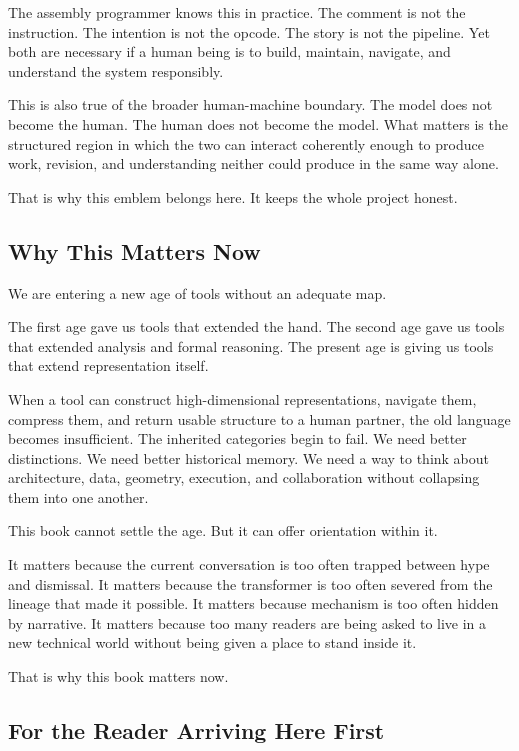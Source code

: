 The assembly programmer knows this in practice. The comment is not the
instruction. The intention is not the opcode. The story is not the
pipeline. Yet both are necessary if a human being is to build, maintain,
navigate, and understand the system responsibly.

This is also true of the broader human-machine boundary. The model does
not become the human. The human does not become the model. What matters
is the structured region in which the two can interact coherently enough
to produce work, revision, and understanding neither could produce in
the same way alone.

That is why this emblem belongs here. It keeps the whole project honest.

\hypertarget{why-this-matters-now}{%
\subsection{Why This Matters Now}\label{why-this-matters-now}}

We are entering a new age of tools without an adequate map.

The first age gave us tools that extended the hand. The second age gave
us tools that extended analysis and formal reasoning. The present age is
giving us tools that extend representation itself.

When a tool can construct high-dimensional representations, navigate
them, compress them, and return usable structure to a human partner, the
old language becomes insufficient. The inherited categories begin to
fail. We need better distinctions. We need better historical memory. We
need a way to think about architecture, data, geometry, execution, and
collaboration without collapsing them into one another.

This book cannot settle the age. But it can offer orientation within it.

It matters because the current conversation is too often trapped between
hype and dismissal. It matters because the transformer is too often
severed from the lineage that made it possible. It matters because
mechanism is too often hidden by narrative. It matters because too many
readers are being asked to live in a new technical world without being
given a place to stand inside it.

That is why this book matters now.

\hypertarget{for-the-reader-arriving-here-first}{%
\subsection{For the Reader Arriving Here
First}\label{for-the-reader-arriving-here-first}}


